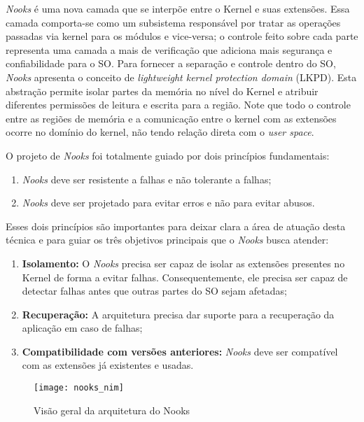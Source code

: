 \emph{Nooks} é uma nova camada que se interpõe entre o Kernel e suas extensões.
Essa camada comporta-se como um subsistema responsável por tratar as operações
passadas via kernel para os módulos e vice-versa; o controle feito sobre cada
parte representa uma camada a mais de verificação que adiciona mais segurança e
confiabilidade para o SO. Para fornecer a separação e controle dentro do SO,
\emph{Nooks} apresenta o conceito de \emph{lightweight kernel protection
domain} (LKPD). Esta abstração permite isolar partes da memória no nível do
Kernel e atribuir diferentes permissões de leitura e escrita para a região.
Note que todo o controle entre as regiões de memória e a comunicação entre o
kernel com as extensões ocorre no domínio do kernel, não tendo relação direta
com o \emph{user space}.

O projeto de \emph{Nooks} foi totalmente guiado por dois princípios
fundamentais:

\begin{enumerate}
	\item \emph{Nooks} deve ser resistente a falhas e não tolerante a falhas;
	\item \emph{Nooks} deve ser projetado para evitar erros e não para evitar
				abusos.
\end{enumerate}

Esses dois princípios são importantes para deixar clara a área de atuação desta
técnica e para guiar os três objetivos principais que o \emph{Nooks} busca
atender:

\begin{enumerate}
	\item \textbf{Isolamento:} O \emph{Nooks} precisa ser capaz de isolar as
				extensões presentes no Kernel de forma a evitar falhas. Consequentemente,
				ele precisa ser capaz de detectar falhas antes que outras partes do
				SO sejam afetadas;
	\item \textbf{Recuperação:} A arquitetura precisa dar suporte para a
				recuperação da aplicação em caso de falhas;
	\item \textbf{Compatibilidade com versões anteriores:} \emph{Nooks} deve ser
				compatível com as extensões já existentes e usadas.
\end{enumerate}

\begin{figure}[!h]
  \centering
  \texttt{[image: nooks\_nim]}
	\caption[Visão geral da arquitetura do Nooks]{Visão geral da arquitetura do Nooks \citep{nooks}}
  \label{fig:nooks_nim}
\end{figure}

